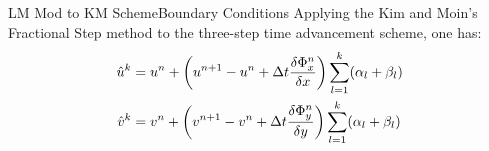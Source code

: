 \documentclass[\string~/GitHub/sthlmNordBeamerTheme/sthlmNordLightDemo.tex]{subfiles}
\begin{document}
\begin{frame}{LM Mod to KM Scheme}{Boundary Conditions}
    Applying the Kim and Moin's Fractional Step method to the three-step time advancement scheme, one has: \begin{align}
        \Hat{u}^k &= u^n + \left( u^{n+1} - u^n + \Delta t \frac{\delta \Phi^n_x}{\delta x} \right) \sum_{l = 1}^k (\alpha_l + \beta_l) \\
        \Hat{v}^k &= v^n + \left( v^{n+1} - v^n + \Delta t \frac{\delta \Phi^n_y}{\delta y} \right) \sum_{l = 1}^k (\alpha_l + \beta_l)
    \end{align}
\end{frame}
\end{document}
